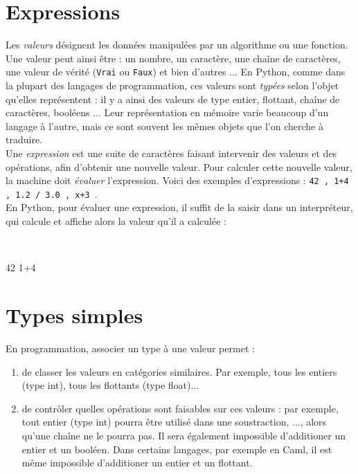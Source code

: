 \section{Expressions}


Les \emph{valeurs} désignent les données manipulées par un algorithme ou une fonction. Une valeur 
peut ainsi être  : un nombre, un caractère, une chaîne de caractères, une valeur de vérité 
(\texttt{Vrai} ou \texttt{Faux}) et bien d'autres ... En Python, comme dans la plupart des 
langages 
de programmation, ces valeurs sont \emph{typées} selon l'objet qu'elles représentent : il y a ainsi 
des valeurs de type entier, flottant, chaîne de caractères, booléens ...   Leur représentation en 
mémoire varie beaucoup d'un langage à l'autre, mais ce sont souvent les mêmes objets que l'on 
cherche à traduire.\\

Une \emph{expression} est une suite de caractères faisant intervenir des valeurs et des 
opérations, afin d'obtenir une nouvelle valeur. Pour calculer cette nouvelle valeur,
la machine doit \emph{évaluer} l'expression. Voici des exemples d'expressions : \texttt{42 , 1+4 , 
1.2 / 3.0 , x+3 }.\\
En Python, pour évaluer une expression, il suffit de la saisir dans un interpréteur, qui
calcule et affiche alors la valeur qu'il a calculée :\\
\begin{xxpy}~\\ 
\vspace{-1cm}
\begin{pyconsole}
42
1+4
\end{pyconsole}
\end{xxpy}
\section{Types simples}

En programmation, associer un type à une valeur permet :
\begin{enumerate}
\item de classer les valeurs en catégories similaires. Par exemple, tous les
entiers (type int), tous les flottants (type float)...
\item de contrôler quelles opérations sont faisables sur ces valeurs : par
exemple, tout entier (type int) pourra être utilisé dans une soustraction, ..., alors 
qu'une chaîne ne le pourra pas. Il sera également impossible d'additioner un entier et un booléen. 
Dans certains langages, par exemple en Caml, il est même impossible d'additioner un entier et un 
flottant.                                             
\end{enumerate}

